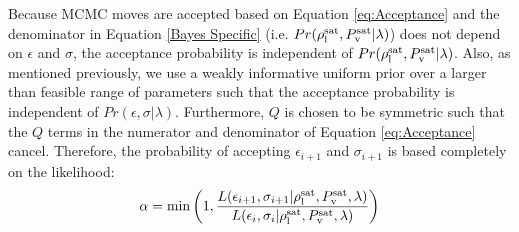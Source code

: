 \documentclass[preprint,letterpaper,floatfix,citeautoscript,aip,jcp]{revtex4-1}
\begin{document}

Because MCMC moves are accepted based on Equation \ref{eq:Acceptance} and the denominator in Equation \ref{Bayes Specific} (i.e. $Pr(\rho_{\rm l}^{\rm sat},P_{\rm v}^{\rm sat}|\lambda)$) does not depend on $\epsilon$ and $\sigma$, the acceptance probability is independent of $Pr(\rho_{\rm l}^{\rm sat},P_{\rm v}^{\rm sat}|\lambda)$. 
%
Also, as mentioned previously, we use a weakly informative uniform prior over a larger than feasible range of parameters such that the acceptance probability is independent of $Pr(\epsilon,\sigma|\lambda)$.
Furthermore, $Q$ is chosen to be symmetric such that the $Q$ terms in the numerator and denominator of Equation \ref{eq:Acceptance} cancel. Therefore, the probability of accepting $\epsilon_{i+1}$ and $\sigma_{i+1}$ is based completely on the likelihood:
\begin{equation} \label{eq:Acceptance Assumptions}
\alpha = \min\left(1,\frac{L(\epsilon_{i+1},\sigma_{i+1}|\rho_{\rm l}^{\rm sat},P_{\rm v}^{\rm sat},\lambda)}{L(\epsilon_i,\sigma_i|\rho_{\rm l}^{\rm sat},P_{\rm v}^{\rm sat},\lambda)}\right)
\end{equation} 
\end{document}
